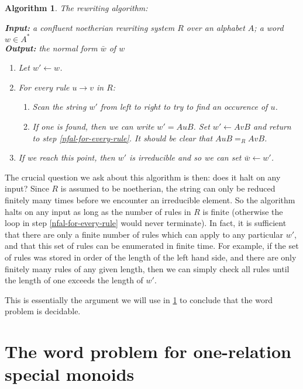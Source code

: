 \documentclass[showlabels,noindex,12pt]{lmaths}
\newtheorem{algorithm}[defn]{Algorithm}
\begin{document}
\begin{algorithm} The rewriting algorithm: \label{alg:rewrite}

\hspace{0.05\textwidth}
\parbox[t]{0.9\textwidth}{
	\textbf{Input:} a confluent noetherian rewriting system $R$ over an alphabet $A$; a word $w \in A^*$ \\
	\textbf{Output:} the normal form $\bar w$ of $w$
	\medskip

	\begin{enumerate}
		\item Let $w' \leftarrow w$.
		\item For every rule $u \to v$ in $R$:	\label{nfal-for-every-rule}
			\begin{enumerate}
				\item Scan the string $w'$ from left to right to try to find an occurence of $u$.
				\item If one is found, then we can write $w' = AuB$. Set $w' \leftarrow AvB$ and return to step \ref{nfal-for-every-rule}. It should be clear that $AuB =_R AvB$.
			\end{enumerate}
		\item If we reach this point, then $w'$ is irreducible and so we can set $\bar w \leftarrow w'$.
	\end{enumerate}
}
\end{algorithm}

The crucial question we ask about this algorithm is then: does it halt on any input? Since $R$ is assumed to be noetherian, the string can only be reduced finitely many times before we encounter an irreducible element. So the algorithm halts on any input as long as the number of rules in $R$ is finite (otherwise the loop in step \ref{nfal-for-every-rule} would never terminate). In fact, it is sufficient that there are only a finite number of rules which can apply to any particular $w'$, and that this set of rules can be enumerated in finite time. For example, if the set of rules was stored in order of the length of the left hand side, and there are only finitely many rules of any given length, then we can simply check all rules until the length of one exceeds the length of $w'$.

This is essentially the argument we will use in \cref{sec:special-monoids} to conclude that the word problem is decidable.

\section{The word problem for one-relation special monoids} \label{sec:special-monoids}
\end{document}
